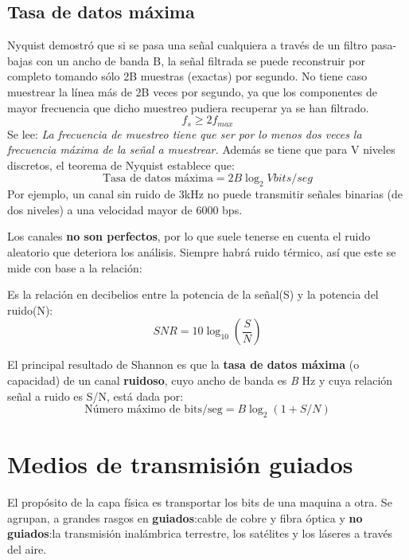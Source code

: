 \documentclass[
	12pt, %
	fleqn, %
	a4paper, %
	oneside, %
]{LegrandOrangeBook}
\begin{document}
\subsection{Tasa de datos máxima}
\begin{definition}
Nyquist demostró que si se pasa una señal cualquiera a través de un filtro pasa-bajas con un ancho de banda B, la señal filtrada se puede reconstruir por completo tomando sólo 2B muestras (exactas) por segundo. No tiene caso muestrear la línea más de 2B veces por segundo, ya que los componentes de mayor frecuencia que dicho muestreo pudiera recuperar ya se han filtrado.
\begin{equation}
\label{eq:teorema de nyquist}
f_{s}\geq 2f_{max}
\end{equation}
Se lee: \textit{La frecuencia de muestreo tiene que ser por lo menos dos veces la frecuencia máxima de la señal a muestrear.}
Además se tiene que para V niveles discretos, el teorema de Nyquist establece que:
\begin{equation}
\label{nyquist niveles}
\text{Tasa de datos máxima}=2B\log_2Vbits/seg
\end{equation}
Por ejemplo, un canal sin ruido de 3kHz no puede transmitir señales binarias (de dos niveles) a una velocidad mayor de 6000 bps.
\end{definition}
Los canales \textbf{no son perfectos}, por lo que suele tenerse en cuenta el ruido aleatorio que deteriora los análisis. Siempre habrá ruido térmico, así que este se mide con base a la relación:
\begin{definition}
Es la relación en decibelios entre la potencia de la señal(S) y la potencia del ruido(N):
\begin{equation}
\label{eq:snr}
SNR=10\log_{10}\left(\frac{S}{N}\right)
\end{equation}
\end{definition}
\begin{definition}
El principal resultado de Shannon es que la \textbf{tasa de datos máxima} (o capacidad) de un canal \textbf{ruidoso}, cuyo ancho de banda es \textit{B} Hz y cuya relación señal a ruido es S/N, está dada por:
\begin{equation}
\text{Número máximo de bits/seg}=B\log_2(1+S/N)
\end{equation}
\end{definition}
\section{Medios de transmisión guiados}
El propósito de la capa física es transportar los bits de una maquina a otra. Se agrupan, a grandes rasgos en \textbf{guiados}:cable de cobre y fibra óptica y \textbf{no guiados}:la transmisión inalámbrica terrestre, los satélites y los láseres a través del aire.
\end{document}
